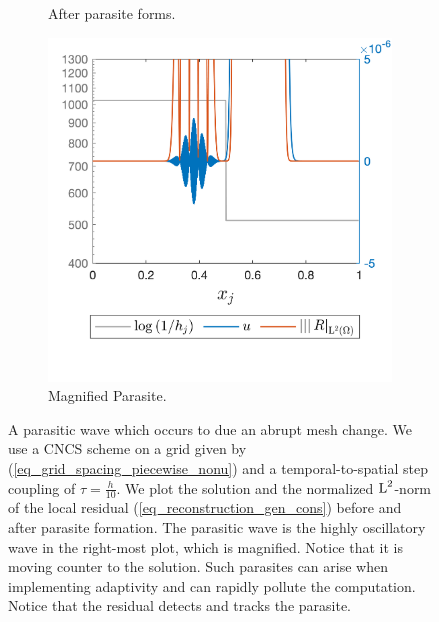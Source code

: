 \documentclass[final]{amsart}
\numberwithin{equation}{section}
\begin{document}
\begin{figure}[H]
\begin{subfigure}[b]{.3\textwidth}
		\caption{\label{fig:CNCS_parasite_1D_1}
			After parasite forms.
		}
	\end{subfigure}
	\begin{subfigure}[b]{.3\textwidth}
		\includegraphics[width=\textwidth]{../figures/fig_CNCS_parasite_rep_3800zoom_on}	
		\caption{\label{fig:CNCS_parasite_1D_2_zoom}
			Magnified Parasite.
		}
	\end{subfigure}
\caption{A parasitic wave which occurs to due an abrupt mesh change.  We use a CNCS scheme on a grid given by (\ref{eq_grid_spacing_piecewise_nonu}) and a temporal-to-spatial step coupling of $\tau=\frac{h}{10}$.  We plot the solution and the normalized $\operatorname L^{2}$-norm of the local residual (\ref{eq_reconstruction_gen_cons}) before and after parasite formation.  The parasitic wave is the highly oscillatory wave in the right-most plot, which is magnified.  Notice that it is moving  counter to the solution. Such parasites can arise when implementing adaptivity and can rapidly pollute the computation. Notice that the residual detects and tracks the parasite.}
\label{fig:CNCS_parasite}
\end{figure}

			
\end{document}
